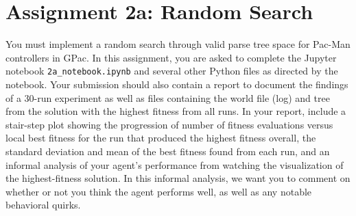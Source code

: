 \documentclass{article}
\begin{document}
\newpage

\section*{Assignment 2a: Random Search}
You must implement a random search through valid parse tree space for Pac-Man controllers in GPac. In this assignment, you are asked to complete the Jupyter notebook \texttt{2a\_notebook.ipynb} and several other Python files as directed by the notebook. Your submission should also contain a report to document the findings of a 30-run experiment as well as files containing the world file (log) and tree from the solution with the highest fitness from all runs. In your report, include a stair-step plot showing the progression of number of fitness evaluations versus local best fitness for the run that produced the highest fitness overall, the standard deviation and mean of the best fitness found from each run, and an informal analysis of your agent's performance from watching the visualization of the highest-fitness solution. In this informal analysis, we want you to comment on whether or not you think the agent performs well, as well as any notable behavioral quirks.
\end{document}
